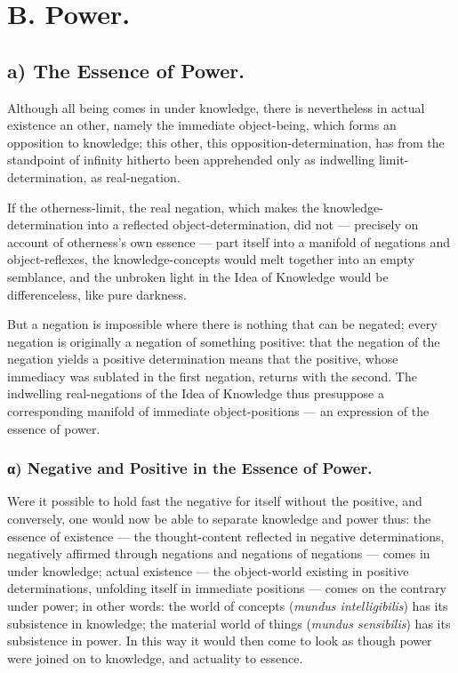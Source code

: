 \documentclass[12pt]{book}
\begin{document}
\chapter*{B. Power.}
\section*{a) The Essence of Power.}

Although all being comes in under knowledge, there is nevertheless
in actual existence an other, namely the immediate object-being,
which forms an opposition to knowledge; this other, this
opposition-determination, has from the standpoint of infinity
hitherto been apprehended only as indwelling limit-determination, as
real-negation.

If the otherness-limit, the real negation, which makes the
knowledge-determination into a reflected object-determination, did
not --- precisely on account of otherness's own essence --- part
itself into a manifold of negations and object-reflexes, the
knowledge-concepts would melt together into an empty semblance, and
the unbroken light in the Idea of Knowledge would be differenceless,
like pure darkness.

But a negation is impossible where there is nothing that can be
negated; every negation is originally a negation of something
positive: that the negation of the negation yields a positive
determination means that the positive, whose immediacy was sublated
in the first negation, returns with the second. The indwelling
real-negations of the Idea of Knowledge thus presuppose a
corresponding manifold of immediate object-positions --- an
expression of the essence of power.

\subsection*{α) Negative and Positive in the Essence of Power.}

Were it possible to hold fast the negative for itself without the
positive, and conversely, one would now be able to separate
knowledge and power thus: the essence of existence --- the
thought-content reflected in negative determinations, negatively
affirmed through negations and negations of negations --- comes in
under knowledge; actual existence --- the object-world existing in
positive determinations, unfolding itself in immediate positions ---
comes on the contrary under power; in other words: the world of
concepts (\textit{mundus intelligibilis}) has its subsistence in
knowledge; the material world of things (\textit{mundus
sensibilis}) has its subsistence in power. In this way it would then
come to look as though power were joined on to knowledge, and
actuality to essence.
\end{document}
